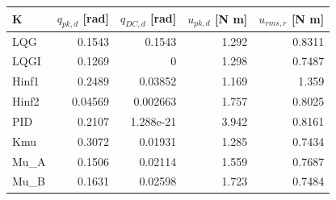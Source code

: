 \begin{center}\small\begin{tabular}{lrrrr}\toprule
K & $q_{pk,d}$ [rad] & $q_{DC,d}$ [rad] & $u_{pk,d}$ [N m] & $u_{rms,r}$ [N m]\\\midrule
LQG & 0.1543 & 0.1543 & 1.292 & 0.8311\\
LQGI & 0.1269 & 0 & 1.298 & 0.7487\\
Hinf1 & 0.2489 & 0.03852 & 1.169 & 1.359\\
Hinf2 & 0.04569 & 0.002663 & 1.757 & 0.8025\\
PID & 0.2107 & 1.288e-21 & 3.942 & 0.8161\\
Kmu & 0.3072 & 0.01931 & 1.285 & 0.7434\\
Mu\_A & 0.1506 & 0.02114 & 1.559 & 0.7687\\
Mu\_B & 0.1631 & 0.02598 & 1.723 & 0.7484\\
\bottomrule\end{tabular}
\end{center}

